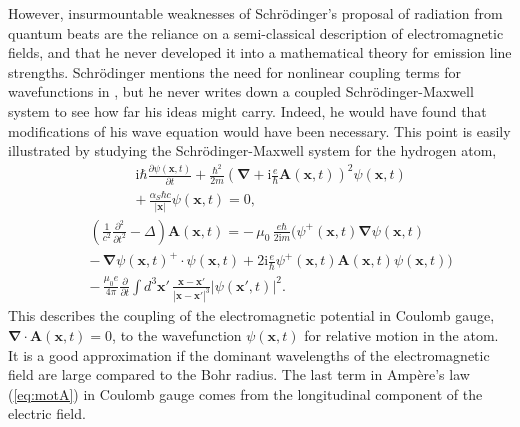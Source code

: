 \documentclass[final,3p,times,twocolumn]{elsarticle3}
\begin{document}
However, insurmountable weaknesses of Schr\"odinger's proposal of radiation from 
quantum beats are the reliance on a semi-classical description of electromagnetic
 fields, and that he never developed it into a mathematical theory for emission line 
strengths. Schr\"odinger mentions the need for nonlinear coupling terms for wavefunctions 
in \cite{erwin3}, but he never writes down a coupled Schr\"odinger-Maxwell system
to see how far his ideas might carry. Indeed, he would have found that modifications
of his wave equation would have been necessary. This point is easily illustrated
by studying the Schr\"odinger-Maxwell system for the hydrogen atom,
\begin{eqnarray}\nonumber
&&\!\!\!\mathrm{i}\hbar\frac{\partial\psi(\bm{x},t)}{\partial t}
+\frac{\hbar^2}{2m}\left(\bm{\nabla}+\mathrm{i}\frac{e}{\hbar}\bm{A}(\bm{x},t)\right)^2
\psi(\bm{x},t)
\\ \label{eq:motpsi}
&&+\,\frac{\alpha_S\hbar c}{|\bm{x}|}\psi(\bm{x},t)=0,
\end{eqnarray}
\begin{eqnarray}\nonumber
&&\!\!\!\left(\frac{1}{c^2}
\frac{\partial^2}{\partial t^2}-\Delta\right)
\bm{A}(\bm{x},t)=
-\,\mu_0\,\frac{e\hbar}{2\mathrm{i}m}
\Big(
\psi^+(\bm{x},t)\bm{\nabla}\psi(\bm{x},t)
\\ \nonumber
&&-\,\bm{\nabla}\psi(\bm{x},t)^+\cdot
\psi(\bm{x},t)
+2\mathrm{i}\frac{e}{\hbar}\psi^+(\bm{x},t)
\bm{A}(\bm{x},t)\psi(\bm{x},t)\Big)
\\ \label{eq:motA}
&&-\,\frac{\mu_0 e}{4\pi}\frac{\partial}{\partial t}\int\!d^3\bm{x}'\,
\frac{\bm{x}-\bm{x}'}{|\bm{x}-\bm{x}'|^3}|\psi(\bm{x}',t)|^2.
\end{eqnarray}
This describes the coupling of the electromagnetic potential in Coulomb gauge,
$\bm{\nabla}\cdot\bm{A}(\bm{x},t)=0$, to the wavefunction $\psi(\bm{x},t)$ for
relative motion in the atom. It is a good approximation if the dominant wavelengths 
of the electromagnetic field are large compared to the Bohr radius. The last term 
in Amp\`{e}re's law (\ref{eq:motA}) in Coulomb gauge comes from the longitudinal
component of the electric field.
\end{document}
